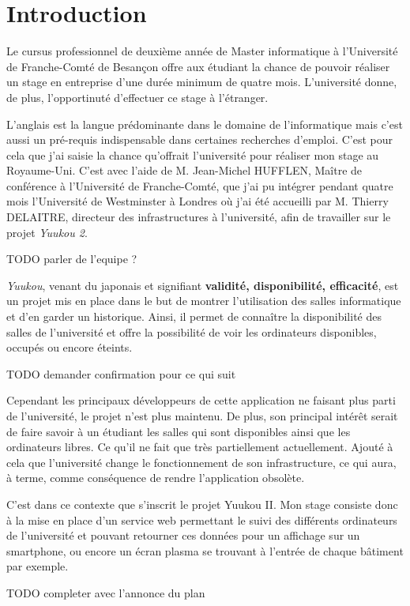 \chapter{Introduction}

Le cursus professionnel de deuxi\`eme ann\'ee de Master informatique \`a l'Universit\'e de Franche-Comt\'e de Besan\c{c}on offre aux \'etudiant la chance de pouvoir r\'ealiser un stage en entreprise d'une dur\'ee minimum de quatre mois. 
L'universit\'e donne, de plus, l'opportinut\'e d'effectuer ce stage \`a l'\'etranger.

L'anglais est la langue pr\'edominante dans le domaine de l'informatique mais c'est aussi un pr\'e-requis indispensable dans certaines recherches d'emploi.
C'est pour cela que j'ai saisie la chance qu'offrait l'universit\'e pour r\'ealiser mon stage au Royaume-Uni. 
C'est avec l'aide de M. Jean-Michel HUFFLEN, Ma\^itre de conf\'erence \`a l'Universit\'e de Franche-Comt\'e, que j'ai pu int\'egrer pendant quatre mois l'Universit\'e de Westminster \`a Londres o\`u j'ai \'et\'e accueilli par M. Thierry DELAITRE, directeur des infrastructures \`a l'universit\'e, afin de travailler sur le projet \textit{Yuukou 2}.

TODO parler de l'equipe ?

\textit{Yuukou}, venant du japonais et signifiant \textbf{validit\'e, disponibilit\'e, efficacit\'e}, est un projet mis en place dans le but de montrer l'utilisation des salles informatique et d'en garder un historique.
Ainsi, il permet de conna\^itre la disponibilit\'e des salles de l'universit\'e et offre la possibilit\'e de voir les ordinateurs disponibles, occup\'es ou encore \'eteints.

TODO demander confirmation pour ce qui suit

Cependant les principaux d\'eveloppeurs de cette application ne faisant plus parti de l'universit\'e, le projet n'est plus maintenu.
De plus, son principal int\'er\^et serait de faire savoir \`a un \'etudiant les salles qui sont disponibles ainsi que les ordinateurs libres.
Ce qu'il ne fait que tr\`es partiellement actuellement.
Ajout\'e \`a cela que l'universit\'e change le fonctionnement de son infrastructure, ce qui aura, \`a terme, comme cons\'equence de rendre l'application obsol\`ete.

C'est dans ce contexte que s'inscrit le projet Yuukou II. 
Mon stage consiste donc \`a la mise en place d'un service web permettant le suivi des diff\'erents ordinateurs de l'universit\'e et pouvant retourner ces donn\'ees pour un affichage sur un smartphone, ou encore un \'ecran plasma se trouvant \`a l'entr\'ee de chaque b\^atiment par exemple.

 TODO completer avec l'annonce du plan

\clearpage
